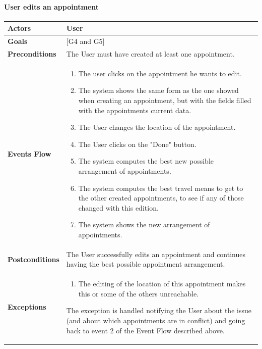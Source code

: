 \documentclass[12pt]{article}
\begin{document}
\newpage

\paragraph{User edits an appointment}

\begin{center}
    \begin{tabular} { |p{}|p{}| }
        \hline
        \textbf{Actors} & User \\ 
        \hline
        \textbf{Goals} & {[G4 and G5]} \\ 
        \hline  
        \textbf{Preconditions} & The User must have created at least one appointment. \\ 
        \hline
        \textbf{Events Flow} & \begin{enumerate}[topsep=0pt] 
                            \setlength{\itemsep}{0.5pt}
                            \item The user clicks on the appointment he wants to edit.
                            \item The system shows the same form as the one showed when creating an appointment, but with the fields filled with the appointments current data.
                            \item The User changes the location of the appointment.
                            \item The User clicks on the "Done" button.
                            \item The system computes the best new possible arrangement of appointments.
                            \item The system computes the best travel means to get to the other created appointments, to see if any of those changed with this edition.
                            \item The system shows the new arrangement of appointments.
                            \end{enumerate} \\
        \hline
        \textbf{Postconditions} & The User successfully edits an appointment and continues having the best possible appointment arrangement. \\
        \hline
        \textbf{Exceptions} & \begin{enumerate}[topsep=0pt] 
                            \setlength{\itemsep}{0.5pt}
                            \item The editing of the location of this appointment makes this or some of the others unreachable.
                            \end{enumerate} 
                            The exception is handled notifying the User about the issue (and about which appointments are in conflict) and going back to event 2 of the Event Flow described above.\\ 
        \hline
    \end{tabular}
\end{center}
\end{document}
